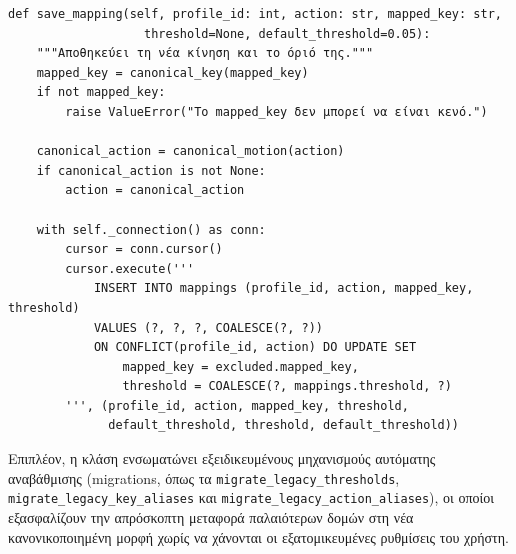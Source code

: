 \documentclass[twoside, a4paper, 11pt]{article}
\newcommand{\textlatin}[1]{\textenglish{#1}}
\begin{document}
\begin{verbatim}
def save_mapping(self, profile_id: int, action: str, mapped_key: str,
                   threshold=None, default_threshold=0.05):
    """Αποθηκεύει τη νέα κίνηση και το όριό της."""
    mapped_key = canonical_key(mapped_key)
    if not mapped_key:
        raise ValueError("Το mapped_key δεν μπορεί να είναι κενό.")

    canonical_action = canonical_motion(action)
    if canonical_action is not None:
        action = canonical_action

    with self._connection() as conn:
        cursor = conn.cursor()
        cursor.execute('''
            INSERT INTO mappings (profile_id, action, mapped_key, threshold)
            VALUES (?, ?, ?, COALESCE(?, ?))
            ON CONFLICT(profile_id, action) DO UPDATE SET
                mapped_key = excluded.mapped_key,
                threshold = COALESCE(?, mappings.threshold, ?)
        ''', (profile_id, action, mapped_key, threshold,
              default_threshold, threshold, default_threshold))
\end{verbatim}

Επιπλέον, η κλάση ενσωματώνει εξειδικευμένους μηχανισμούς αυτόματης αναβάθμισης (\textlatin{migrations}, όπως τα \texttt{migrate\_legacy\_thresholds}, \texttt{migrate\_legacy\_key\_aliases} και \texttt{migrate\_legacy\_action\_aliases}), οι οποίοι εξασφαλίζουν την απρόσκοπτη μεταφορά παλαιότερων δομών στη νέα κανονικοποιημένη μορφή χωρίς να χάνονται οι εξατομικευμένες ρυθμίσεις του χρήστη.
\end{document}
